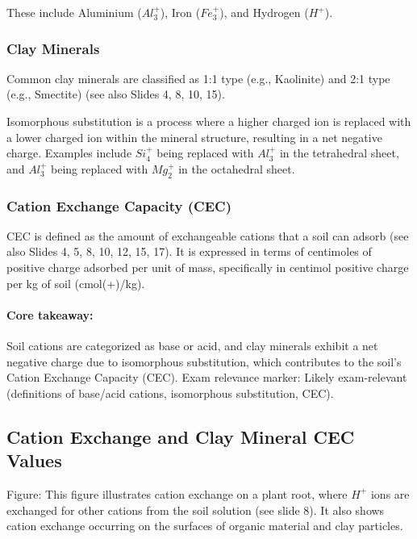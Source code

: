 These include Aluminium ($Al_3^+$), Iron ($Fe_3^+$), and Hydrogen ($H^+$).

\subsubsection{Clay Minerals} 
Common clay minerals are classified as 1:1 type (e.g., Kaolinite) and 2:1 type (e.g., Smectite) (see also Slides 4, 8, 10, 15).

Isomorphous substitution is a process where a higher charged ion is replaced with a lower charged ion within the mineral structure, resulting in a net negative charge. Examples include $Si_4^+$ being replaced with $Al_3^+$ in the tetrahedral sheet, and $Al_3^+$ being replaced with $Mg_2^+$ in the octahedral sheet.

\subsubsection{Cation Exchange Capacity (CEC)} 
CEC is defined as the amount of exchangeable cations that a soil can adsorb (see also Slides 4, 5, 8, 10, 12, 15, 17). It is expressed in terms of centimoles of positive charge adsorbed per unit of mass, specifically in centimol positive charge per kg of soil (cmol(+)/kg).

\paragraph*{Core takeaway:} 
Soil cations are categorized as base or acid, and clay minerals exhibit a net negative charge due to isomorphous substitution, which contributes to the soil's Cation Exchange Capacity (CEC). Exam relevance marker: Likely exam-relevant (definitions of base/acid cations, isomorphous substitution, CEC).

\subsection{Cation Exchange and Clay Mineral CEC Values}
Figure: This figure illustrates cation exchange on a plant root, where $H^+$ ions are exchanged for other cations from the soil solution (see slide 8). It also shows cation exchange occurring on the surfaces of organic material and clay particles.

